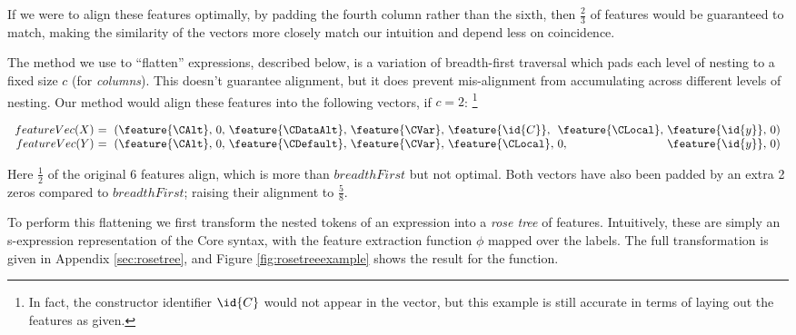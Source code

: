 If we were to align these features optimally, by padding the fourth column
rather than the sixth, then $\frac{2}{3}$ of features would be guaranteed to
match, making the similarity of the vectors more closely match our intuition and
depend less on coincidence.

The method we use to ``flatten'' expressions, described below, is a variation of
breadth-first traversal which pads each level of nesting to a fixed size $c$
(for \emph{columns}). This doesn't guarantee alignment, but it does prevent
mis-alignment from accumulating across different levels of nesting. Our method
would align these features into the following vectors, if $c = 2$: \footnote{In
  fact, the constructor identifier $\id{C}$ would not appear in the vector, but
  this example is still accurate in terms of laying out the features as given.}

\begin{small}
  \begin{equation}\label{eq:flattened}
    \begin{array}{r@{}l@{}l@{}l@{}l@{}l@{}l@{}l@{}l@{}l}
      featureVec(X)\ &=\ (\feature{\CAlt},\ &0,\ &\feature{\CDataAlt},\ &\feature{\CVar},\ &\feature{\id{C}},\  &\feature{\CLocal},\ &\feature{\id{y}},\ &0 &) \\
      featureVec(Y)\ &=\ (\feature{\CAlt},\ &0,\ &\feature{\CDefault},\ &\feature{\CVar},\ &\feature{\CLocal},\ &0,\                 &\feature{\id{y}},\ &0 &)
    \end{array}
  \end{equation}
\end{small}

Here $\frac{1}{2}$ of the original 6 features align, which is more than
$breadthFirst$ but not optimal. Both vectors have also been padded by an extra 2
zeros compared to $breadthFirst$; raising their alignment to $\frac{5}{8}$.

To perform this flattening we first transform the nested tokens of an expression
into a \emph{rose tree} of features. Intuitively, these are simply an
s-expression representation of the Core syntax, with the feature extraction
function $\phi$ mapped over the labels. The full transformation is given in
Appendix \ref{sec:rosetree}, and Figure \ref{fig:rosetreeexample} shows the
result for the  function.


